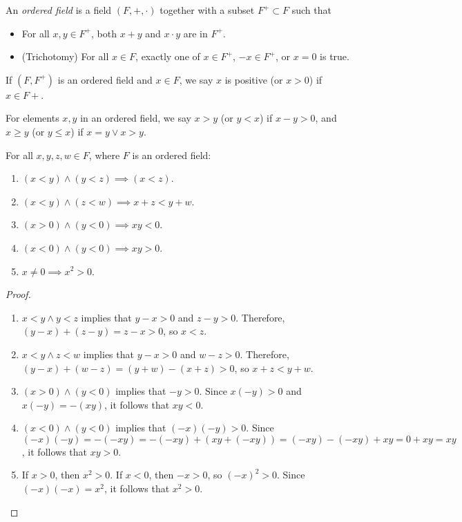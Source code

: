 \begin{defn}
    An \emph{ordered field} is a field $(F, +, \cdot)$ together with a subset $F^+ \subset F$ such that\begin{itemize}
        \item For all $x, y \in F^+$, both $x + y$ and $x \cdot y$ are in $F^+$.
        \item (Trichotomy) For all $x \in F$, exactly one of $x \in F^+$, $-x \in F^+$, or $x = 0$ is true.
    \end{itemize}
\end{defn}

If $(F, F^+)$ is an ordered field and $x \in F$, we say $x$ is positive (or $x > 0$) if $x \in F+$.

\begin{defn}
    For elements $x, y$ in an ordered field, we say $x > y$ (or $y < x$) if $x - y > 0$, and $x \geq y$ (or $y \leq x$) if $x = y \lor x > y$.
\end{defn}

\begin{thm} For all $x, y, z, w \in F$, where $F$ is an ordered field:
    \begin{enumerate}
        \item $(x < y) \land (y < z) \implies (x < z)$.
        \item $(x < y) \land (z < w) \implies x + z < y + w$.
        \item $(x > 0) \land (y < 0) \implies xy < 0$.
        \item $(x < 0) \land (y < 0) \implies xy > 0$.
        \item $x \neq 0 \implies x^2 > 0$.
    \end{enumerate}
\end{thm}

\begin{proof}\proofbreak
    \begin{enumerate}
        \item $x < y \land y < z$ implies that $y - x > 0$ and $z - y > 0$. Therefore, $(y - x) + (z - y) = z - x > 0$, so $x < z$.
        \item $x < y \land z < w$ implies that $y - x > 0$ and $w - z > 0$. Therefore, $(y - x) + (w - z) = (y + w) - (x + z) > 0$, so $x + z < y + w$.
        \item $(x > 0) \land (y < 0)$ implies that $-y > 0$. Since $x(-y) > 0$ and $x(-y) = -(xy)$, it follows that $xy < 0$.
        \item $(x < 0) \land (y < 0)$ implies that $(-x)(-y) > 0$. Since $(-x)(-y) = -(-xy) = -(-xy) + (xy  + (-xy)) = (-xy) - (-xy) + xy = 0 + xy = xy$, it follows that $xy > 0$.
        \item If $x > 0$, then $x^2 > 0$. If $x < 0$, then $-x > 0$, so $(-x)^2 > 0$. Since $(-x)(-x) = x^2$, it follows that $x^2 > 0$.
    \end{enumerate}
\end{proof}

